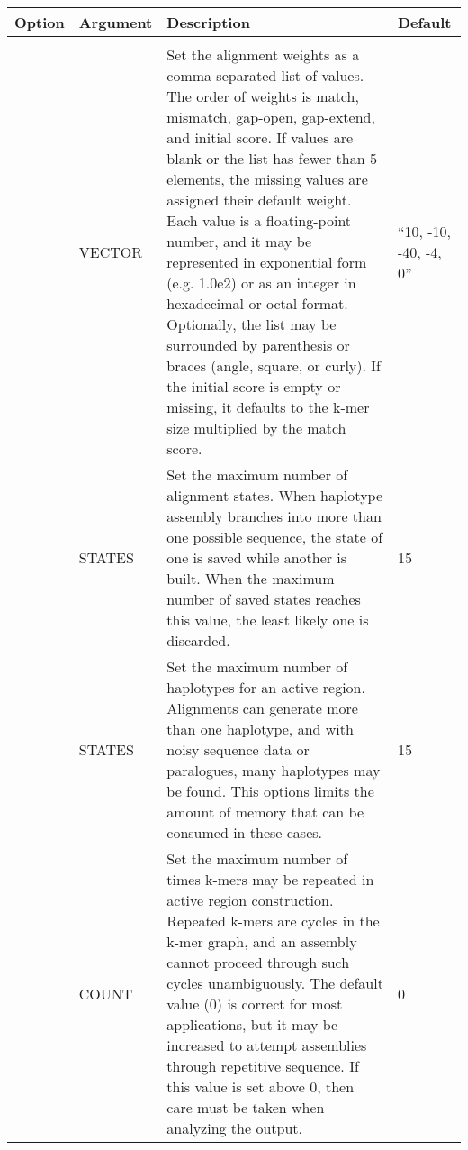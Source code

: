 \begin{small}
	\begin{longtable}{|p{\optwidth}|p{\argwidth}|p{\dscwidth}|p{}|}
		\hline
		
		\textbf{Option} & \textbf{Argument} & \textbf{Description} & \textbf{Default} \\ \hline
		
		\optbox{\sopt{w}\\\lopt{weight}} & VECTOR &
		Set the alignment weights as a comma-separated list of values. The order of weights is match, mismatch, gap-open, gap-extend, and initial score. If values are blank or the list has fewer than 5 elements, the missing values are assigned their default weight. Each value is a floating-point number, and it may be represented in exponential form (e.g. 1.0e2) or as an integer in hexadecimal or octal format. Optionally, the list may be surrounded by parenthesis or braces (angle, square, or curly). If the initial score is empty or missing, it defaults to the k-mer size multiplied by the match score.
		& ``10, -10, -40, -4, 0''
		\\ \hline
		
		\lopt{maxalignstates} & STATES &
		Set the maximum number of alignment states. When haplotype assembly branches into more than one possible sequence, the state of one is saved while another is built. When the maximum number of saved states reaches this value, the least likely one is discarded.
		& 15
		\\ \hline
		
		\lopt{maxhapstates} & STATES &
		Set the maximum number of haplotypes for an active region. Alignments can generate more than one haplotype, and with noisy sequence data or paralogues, many haplotypes may be found. This options limits the amount of memory that can be consumed in these cases.
		& 15
		\\ \hline
		
		\lopt{maxrepeat} & COUNT &
		Set the maximum number of times k-mers may be repeated in active region construction. Repeated k-mers are cycles in the k-mer graph, and an assembly cannot proceed through such cycles unambiguously. The default value (0) is correct for most applications, but it may be increased to attempt assemblies through repetitive sequence. If this value is set above 0, then care must be taken when analyzing the output.
		& 0
		\\ \hline

	\end{longtable}
\end{small}

